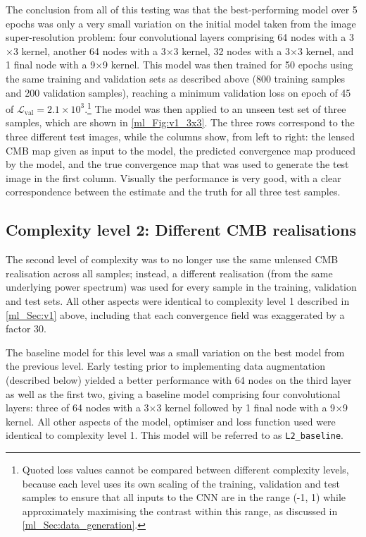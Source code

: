 The conclusion from all of this testing was that the best-performing model over 5 epochs was only a very small variation on the initial model taken from the image super-resolution problem: four convolutional layers comprising 64 nodes with a 3$\times$3 kernel, another 64 nodes with a 3$\times$3 kernel, 32 nodes with a 3$\times$3 kernel, and 1 final node with a 9$\times$9 kernel. This model was then trained for 50 epochs using the same training and validation sets as described above (800 training samples and 200 validation samples), reaching a minimum validation loss on epoch of 45 of $\mathcal{L}_\text{val} = 2.1 \times 10^3$.\footnote{Quoted loss values cannot be compared between different complexity levels, because each level uses its own scaling of the training, validation and test samples to ensure that all inputs to the CNN are in the range (-1, 1) while approximately maximising the contrast within this range, as discussed in \autoref{ml_Sec:data_generation}.} The model was then applied to an unseen test set of three samples, which are shown in \autoref{ml_Fig:v1_3x3}. The three rows correspond to the three different test images, while the columns show, from left to right: the lensed CMB map given as input to the model, the predicted convergence map produced by the model, and the true convergence map that was used to generate the test image in the first column. Visually the performance is very good, with a clear correspondence between the estimate and the truth for all three test samples.

\subsection{Complexity level 2: Different CMB realisations}
\label{ml_Sec:v2}

The second level of complexity was to no longer use the same unlensed CMB realisation across all samples; instead, a different realisation (from the same underlying power spectrum) was used for every sample in the training, validation and test sets. All other aspects were identical to complexity level 1 described in \autoref{ml_Sec:v1} above, including that each convergence field was exaggerated by a factor 30.

The baseline model for this level was a small variation on the best model from the previous level. Early testing prior to implementing data augmentation (described below) yielded a better performance with 64 nodes on the third layer as well as the first two, giving a baseline model comprising four convolutional layers: three of 64 nodes with a 3$\times$3 kernel followed by 1 final node with a 9$\times$9 kernel. All other aspects of the model, optimiser and loss function used were identical to complexity level 1. This model will be referred to as \texttt{L2\_baseline}.

